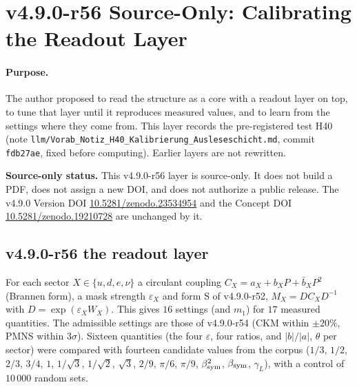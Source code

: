 \clearpage
\section*{v4.9.0-r56 Source-Only: Calibrating the Readout Layer}
\label{sec:v490-r56-readout-calibration}

\paragraph{Purpose.}
The author proposed to read the structure as a core with a readout layer on top, to tune that layer until it reproduces measured values, and to learn from
the settings where they come from.  This layer records the pre-registered test H40 (note \texttt{llm/Vorab\_Notiz\_H40\_Kalibrierung\_Ausleseschicht.md},
commit \texttt{fdb27ae}, fixed before computing).  Earlier layers are not rewritten.

\noindent\textbf{Source-only status.}
This v4.9.0-r56 layer is source-only.  It does not build a PDF, does not assign a new DOI,
and does not authorize a public release.  The v4.9.0 Version DOI
\href{https://doi.org/10.5281/zenodo.23534954}{10.5281/zenodo.23534954} and the Concept DOI
\href{https://doi.org/10.5281/zenodo.19210728}{10.5281/zenodo.19210728} are unchanged by it.

\subsection*{v4.9.0-r56 the readout layer}
\label{subsec:v490-r56-layer}

For each sector \(X\in\{u,d,e,\nu\}\) a circulant coupling \(C_X=a_X+b_XP+\bar b_XP^2\) (Brannen form), a mask strength \(\varepsilon_X\) and form S of
v4.9.0-r52, \(M_X=DC_XD^{-1}\) with \(D=\exp(\varepsilon_XW_X)\).  This gives \(16\) settings (and \(m_1\)) for \(17\) measured quantities.  The admissible
settings are those of v4.9.0-r54 (CKM within \(\pm20\%\), PMNS within \(3\sigma\)).  Sixteen quantities (the four \(\varepsilon\), four ratios, and
\(|b|/|a|\), \(\theta\) per sector) were compared with fourteen candidate values from the corpus (\(1/3\), \(1/2\), \(2/3\), \(3/4\), \(1\), \(1/\sqrt3\), \(1/\sqrt2\),
\(\sqrt3\), \(2/9\), \(\pi/6\), \(\pi/9\), \(\beta_{\rm sym}^2\), \(\beta_{\rm sym}\), \(\gamma_L\)), with a control of \(10\,000\) random sets.

